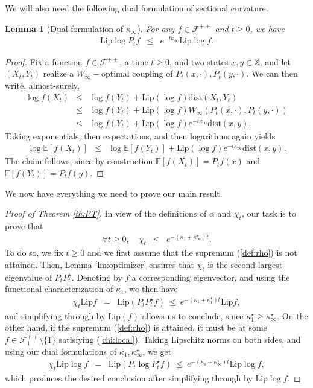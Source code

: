 \documentclass[12pt,final]{article}
\newtheorem{lemma}{Lemma}[section]
\numberwithin{equation}{section}
\newcommand{\Lip}{\mathrm {Lip}}
\newcommand{\EE}{{\mathbb{E}}}
\newcommand{\cF}{\mathcal {F}}
\newcommand{\dX}{\mathbb{X}}
\newcommand{\dist}{\mathrm{dist}}
\begin{document}
We will also need the following dual formulation of sectional curvature. 
\begin{lemma}[Dual formulation of $\kappa_\infty$]For any $f\in\cF^{++}$ and  $t\ge 0$, we have
\begin{eqnarray*}
\Lip \log P_tf  & \le & e^{-t\kappa_\infty }\Lip \log f.
\end{eqnarray*}
\end{lemma}
\begin{proof}
 Fix a function $f\in\cF^{++}$, a time $t\ge 0$, and two states $x,y\in\dX$, and let $(X_t,Y_t)$ realize a  $W_\infty-$optimal coupling of $P_t(x,\cdot),P_t(y,\cdot)$. We can then write, almost-surely,
\begin{eqnarray*}
\log f(X_t) & \le & \log f(Y_t)+\Lip(\log f)\dist(X_t,Y_t)\\
& \le & \log f(Y_t)+\Lip(\log f)W_\infty\left(P_t(x,\cdot),P_t(y,\cdot)\right)\\
& \le & \log f(Y_t)+\Lip(\log f)e^{-t\kappa_\infty}\dist(x,y).
\end{eqnarray*}
Taking exponentials, then expectations, and then logarithms again yields
\begin{eqnarray*}
\log \EE[f(X_t)] & \le & \log \EE[f(Y_t)]+\Lip(\log f)e^{-t\kappa_\infty}\dist(x,y).
\end{eqnarray*}
The claim follows, since by construction $\EE[f(X_t)]=P_tf(x)$ and $\EE[f(Y_t)]=P_tf(y)$.
\end{proof}
We now have everything we need to prove our main result.
\begin{proof}[Proof of Theorem \ref{th:PT}]In view of the definitions of $\alpha$ and $\chi_t$, our task is to prove that 
\begin{eqnarray*}
\forall t\ge 0,\quad \chi_t & \le & e^{-(\kappa_1+\kappa_\infty^\star)t}.
\end{eqnarray*}
To do so, we fix $t\ge 0$ and we first assume that the supremum  (\ref{def:rho}) is not attained. Then, Lemma \ref{lm:optimizer} ensures that $\chi_t$ is the second largest eigenvalue of $P_tP_t^\star$. Denoting by $f$ a corresponding eigenvector, and using the functional characterization of $\kappa_1$, we then have 
\begin{eqnarray*}
\chi_t\Lip f & = & \Lip(P_tP_t^\star f) \ \le \ e^{-(\kappa_1+\kappa_1^\star)t}\Lip f,
\end{eqnarray*}  
and simplifying through by $\Lip(f)$ allows us to conclude, since $\kappa_1^\star\ge\kappa_\infty^\star$. On the other hand, if the supremum (\ref{def:rho}) is attained, it must be  at some $f\in\cF^{++}_1\setminus\{1\}$ satisfying
(\ref{chi:local}). Taking Lipschitz norms on both sides, and using our dual formulations of $\kappa_1,\kappa_\infty^\star$, we get
\begin{eqnarray*}
\chi_t\Lip \log f & = & \Lip\left(P_t\log P_t^\star f\right)
\ \le \ e^{-(\kappa_1 +\kappa_\infty^\star)t}\Lip \log f, 
\end{eqnarray*}
which produces the desired conclusion after simplifying through by $\Lip \log f$.
\end{proof}
\end{document}
